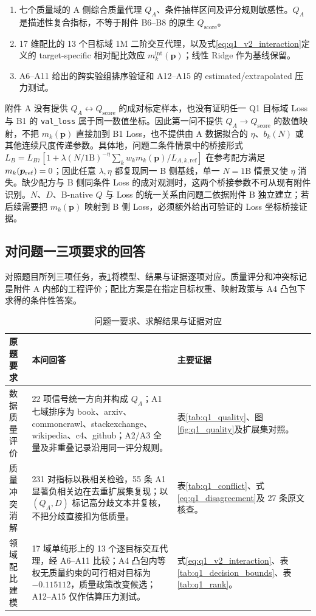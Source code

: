 \begin{enumerate}
  \item 七个质量域的 A 侧综合质量代理 $Q_A$、条件抽样区间及评分规则敏感性。$Q_A$ 是描述性复合指标，不等于附件 B6--B8 的原生 $Q_{\mathrm{score}}$。
  \item 17 维配比的 13 个目标域 1M 二阶交互代理，以及式\eqref{eq:q1_v2_interaction}定义的 target-specific 相对配比效应 $m_k^{\mathrm{int}}(\boldsymbol p)$；线性 Ridge 作为基线保留。
  \item A6--A11 给出的跨实验组排序验证和 A12--A15 的 estimated/extrapolated 压力测试。
\end{enumerate}

附件 A 没有提供 $Q_A\leftrightarrow Q_{\mathrm{score}}$ 的成对标定样本，也没有证明任一 Q1 目标域 Loss 与 B1 的 \texttt{val\_loss} 属于同一数值坐标。因此第一问不提供 $Q_A\to Q_{\mathrm{score}}$ 的数值映射，不把 $m_k(\boldsymbol p)$ 直接加到 B1 Loss，也不提供由 A 数据拟合的 $\eta$、$b_k(N)$ 或其他连续尺度传递参数。具体地，问题二条件情景中的桥接形式 $L_B=L_{B7}[1+\lambda(N/1\mathrm{B})^{-\eta}\sum_kw_km_k(\boldsymbol p)/L_{A,k,\mathrm{ref}}]$ 在参考配方满足 $m_k(\boldsymbol p_{\rm ref})=0$；因此任意 $\lambda,\eta$ 都复现同一 B 侧基线，单一 $N=1\mathrm{B}$ 情景又使 $\eta$ 消失。缺少配方与 B 侧同条件 Loss 的成对观测时，这两个桥接参数不可从现有附件识别。$N$、$D$、B-native $Q$ 与 Loss 的统一关系由问题二依据附件 B 独立建立；若后续需要把 $m_k(\boldsymbol p)$ 映射到 B 侧 Loss，必须额外给出可验证的 Loss 坐标桥接证据。

\subsection{对问题一三项要求的回答}

对照题目所列三项任务，表\ref{tab:q1_answer}将模型、结果与证据逐项对应。质量评分和冲突标记是附件 A 内部的工程评价；配比方案是在指定目标权重、映射政策与 A4 凸包下求得的条件性答案。

\begin{table}[htbp]
\centering\small
\caption{问题一要求、求解结果与证据对应}
\label{tab:q1_answer}
\begin{tabular}{p{.16\linewidth}p{.47\linewidth}p{.27\linewidth}}
\toprule
原题要求 & 本问回答 & 主要证据 \\
\midrule
数据质量评价 & 22 项信号统一方向并构成 $Q_A$；A1 七域排序为 book、arxiv、commoncrawl、stackexchange、wikipedia、c4、github；A2/A3 全量及非重叠记录沿用同一评分规则。 & 表\ref{tab:q1_quality}、图\ref{fig:q1_quality}及扩展集对照。 \\
质量冲突消解 & 231 对指标以秩相关检验，55 条 A1 显著负相关边在去重扩展集复现；以 $(Q_A,D)$ 标记高分歧文本并复核，不把分歧直接扣为低质量。 & 表\ref{tab:q1_conflict}、式\eqref{eq:q1_disagreement}及 27 条原文核查。 \\
领域配比建模 & 17 域单纯形上的 13 个逐目标交互代理，经 A6--A11 比较；A4 凸包内等权无质量约束的可行相对目标为 $-0.115112$，质量政策改变候选；A12--A15 仅作估算压力测试。 & 式\eqref{eq:q1_v2_interaction}、表\ref{tab:q1_decision_bounds}、表\ref{tab:q1_rank}。 \\
\bottomrule
\end{tabular}
\end{table}

